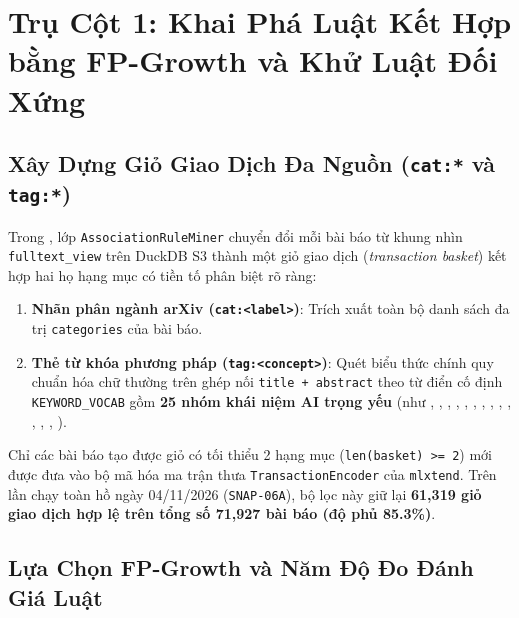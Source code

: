 
\section{Trụ Cột 1: Khai Phá Luật Kết Hợp bằng FP-Growth và Khử Luật Đối Xứng}
\label{sec:ch4_fpgrowth}

\subsection{Xây Dựng Giỏ Giao Dịch Đa Nguồn (\texttt{cat:*} và \texttt{tag:*})}
\label{sec:ch4_baskets}

Trong , lớp \texttt{AssociationRuleMiner} chuyển đổi mỗi bài báo từ khung nhìn \texttt{fulltext\_view} trên DuckDB S3 thành một giỏ giao dịch (\textit{transaction basket}) kết hợp hai họ hạng mục có tiền tố phân biệt rõ ràng:
\begin{enumerate}[label=\textbf{\arabic*.}]
  \item \textbf{Nhãn phân ngành arXiv (\texttt{cat:<label>})}: Trích xuất toàn bộ danh sách đa trị \texttt{categories} của bài báo.
  \item \textbf{Thẻ từ khóa phương pháp (\texttt{tag:<concept>})}: Quét biểu thức chính quy chuẩn hóa chữ thường trên ghép nối \texttt{title + abstract} theo từ điển cố định \texttt{KEYWORD\_VOCAB} gồm \textbf{25 nhóm khái niệm AI trọng yếu} (như , , , , , , , , , , , , , ).
\end{enumerate}

Chỉ các bài báo tạo được giỏ có tối thiểu 2 hạng mục (\texttt{len(basket) >= 2}) mới được đưa vào bộ mã hóa ma trận thưa \texttt{TransactionEncoder} của \texttt{mlxtend}. Trên lần chạy toàn hồ ngày 04/11/2026 (\texttt{SNAP-06A}), bộ lọc này giữ lại \textbf{61,319 giỏ giao dịch hợp lệ trên tổng số 71,927 bài báo (độ phủ 85.3\%)}.

\subsection{Lựa Chọn FP-Growth và Năm Độ Đo Đánh Giá Luật}
\label{sec:ch4_fpgrowth_metrics}

